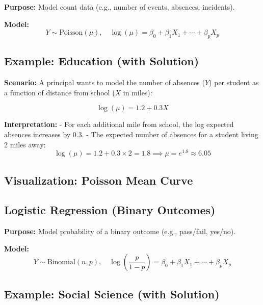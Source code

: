 \documentclass[11pt]{article}
\begin{document}
\textbf{Purpose:} Model count data (e.g., number of events, absences, incidents).

\textbf{Model:}
\[
Y \sim \text{Poisson}(\mu), \quad \log(\mu) = \beta_0 + \beta_1 X_1 + \cdots + \beta_p X_p
\]

\subsection*{Example: Education (with Solution)}

\textbf{Scenario:} A principal wants to model the number of absences ($Y$) per student as a function of distance from school ($X$ in miles):

\[
\log(\mu) = 1.2 + 0.3 X
\]

\textbf{Interpretation:}
- For each additional mile from school, the log expected absences increases by 0.3.
- The expected number of absences for a student living 2 miles away:
\[
\log(\mu) = 1.2 + 0.3 \times 2 = 1.8 \implies \mu = e^{1.8} \approx 6.05
\]

\subsection*{Visualization: Poisson Mean Curve}
\begin{center}
\end{center}

\subsection{Logistic Regression (Binary Outcomes)}

\textbf{Purpose:} Model probability of a binary outcome (e.g., pass/fail, yes/no).

\textbf{Model:}
\[
Y \sim \text{Binomial}(n, p), \quad \log\left(\frac{p}{1-p}\right) = \beta_0 + \beta_1 X_1 + \cdots + \beta_p X_p
\]

\subsection*{Example: Social Science (with Solution)}
\end{document}
